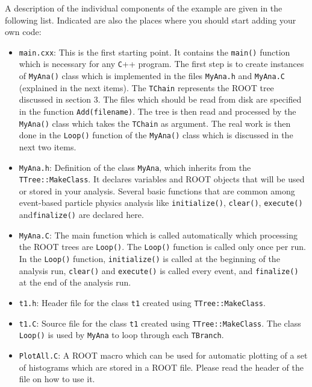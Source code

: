 A description of the individual components of the example are given in the following list. Indicated are also the places where you should start adding your own code:

\begin{itemize}
\item  \verb+main.cxx+: This is the first starting point. It contains the \verb+main()+ function which is necessary for any \verb+C+++ program. The first step is to create instances of \verb+MyAna()+ class which is implemented in the files \verb+MyAna.h+ and \verb+MyAna.C+ (explained in the next items). The \verb+TChain+ represents the ROOT tree discussed in section 3. The files which should be read from disk are specified in the function \verb+Add(filename)+. The tree is then read and processed by the \verb+MyAna()+ class which takes the \verb+TChain+ as argument. The real work is then done in the \verb+Loop()+ function of the \verb+MyAna()+ class which is discussed in the next two items. 

\item \verb+MyAna.h+: Definition of the class \verb+MyAna+, which inherits from the \verb+TTree::MakeClass+. It declares variables and ROOT objects that will be used or stored in your analysis. Several basic functions that are common among event-based particle physics analysis like \verb+initialize()+, \verb+clear()+, \verb+execute()+ and\verb+finalize()+ are declared here.
\item \verb+MyAna.C+: The main function which is called automatically which processing the ROOT trees are \verb+Loop()+. The \verb+Loop()+ function is called only once per run. In the \verb+Loop()+ function, \verb+initialize()+ is called at the beginning of the analysis run, \verb+clear()+ and \verb+execute()+ is called every event, and \verb+finalize()+ at the end of the analysis run.

\item \verb+t1.h+: Header file for the class \verb+t1+ created using \verb+TTree::MakeClass+.  

\item \verb+t1.C+: Source file for the class \verb+t1+ created using \verb+TTree::MakeClass+. The class \verb+Loop()+ is used by \verb+MyAna+ to loop through each \verb+TBranch+.

\item \verb+PlotAll.C+: A ROOT macro which can be used for automatic plotting of a set of histograms which are stored in a ROOT file. Please read the header of the file on how to use it. 
\end{itemize}

